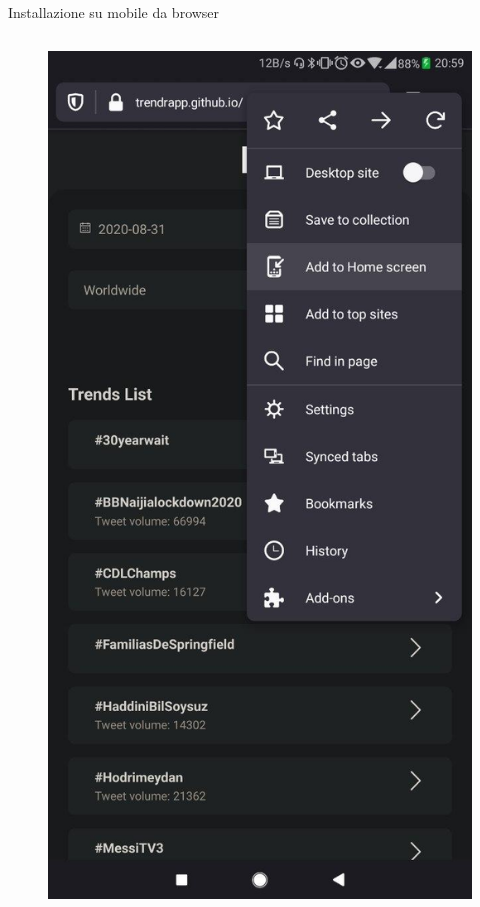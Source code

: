 \documentclass[xcolor=svgnames, aspectratio=169]{beamer}
\begin{document}
\begin{frame}{Installazione su mobile da browser}
\begin{columns}[t]
\begin{figure}[H]
            \includegraphics[width=0.32\paperwidth,height=0.7\paperheight,keepaspectratio]{Mobile_Firefox_Installazione_Menu_aggiungi.jpg}
        \end{figure}
        \vspace*{-8pt}

\end{columns}
\end{frame}
\end{document}
